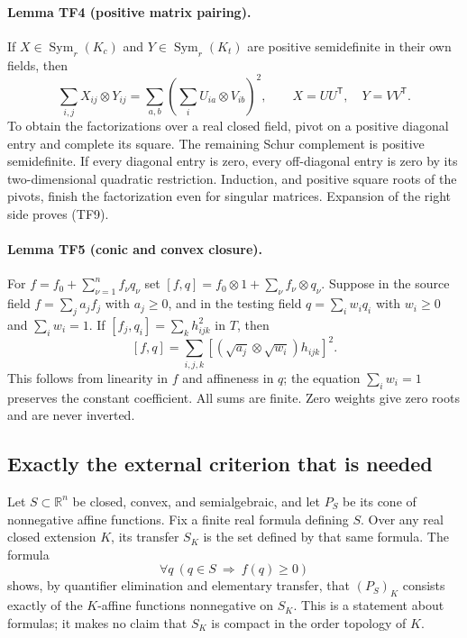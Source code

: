 \paragraph{Lemma TF4 (positive matrix pairing).}
If $X\in\operatorname{Sym}_r(K_c)$ and
$Y\in\operatorname{Sym}_r(K_t)$ are positive semidefinite in their
own fields, then
\[
 \sum_{i,j}X_{ij}\otimes Y_{ij}
 =\sum_{a,b}\left(\sum_i U_{ia}\otimes V_{ib}\right)^2,
 \qquad X=UU^{\mathsf T},\quad Y=VV^{\mathsf T}.
 \tag{TF9}
\]
To obtain the factorizations over a real closed field, pivot on a
positive diagonal entry and complete its square. The remaining
Schur complement is positive semidefinite. If every diagonal entry
is zero, every off-diagonal entry is zero by its two-dimensional
quadratic restriction. Induction, and positive square roots of the
pivots, finish the factorization even for singular matrices.
Expansion of the right side proves (TF9).

\paragraph{Lemma TF5 (conic and convex closure).}
For $f=f_0+\sum_{\nu=1}^n f_\nu q_\nu$ set
$[f,q]=f_0\otimes1+\sum_\nu f_\nu\otimes q_\nu$.
Suppose in the source field
$f=\sum_j a_j f_j$ with $a_j\ge0$, and in the testing field
$q=\sum_i w_i q_i$ with $w_i\ge0$ and $\sum_iw_i=1$.
If $[f_j,q_i]=\sum_k h_{ijk}^2$ in $T$, then
\[
             [f,q]=\sum_{i,j,k}
                \left[(\sqrt{a_j}\otimes\sqrt{w_i})h_{ijk}\right]^2.
 \tag{TF10}
\]
This follows from linearity in $f$ and affineness in $q$; the equation
$\sum_iw_i=1$ preserves the constant coefficient. All sums are finite.
Zero weights give zero roots and are never inverted.

\subsection{Exactly the external criterion that is needed}
Let $S\subset\mathbb R^n$ be closed, convex, and semialgebraic, and
let $P_S$ be its cone of nonnegative affine functions. Fix a finite
real formula defining $S$. Over any real closed extension $K$, its
transfer $S_K$ is the set defined by that same formula. The formula
\[
          \forall q\ (q\in S\ \Longrightarrow\ f(q)\ge0)
 \tag{TF11}
\]
shows, by quantifier elimination and elementary transfer, that
$(P_S)_K$ consists exactly of the $K$-affine functions nonnegative
on $S_K$. This is a statement about formulas; it makes no claim
that $S_K$ is compact in the order topology of $K$.

